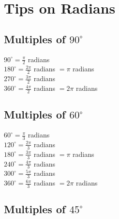 \documentclass[12pt]{article}
\begin{document}
\section*{Tips on Radians}

\subsection*{Multiples of $90^\circ$}


\begin{multicols}{2}

$90^\circ=\frac{\pi}{2}$ radians \\

$180^\circ=\frac{2\pi}{2}$ radians $=\pi$ radians \\
 
$270^\circ=\frac{3\pi}{2}$ radians \\
 
 $360^\circ=\frac{4\pi}{2}$ radians $=2\pi$ radians\\

\end{multicols}

\subsection*{Multiples of $60^\circ$}


\begin{multicols}{2}

$60^\circ=\frac{\pi}{3}$ radians \\
 
$120^\circ=\frac{2\pi}{3}$ radians \\
  
$180^\circ=\frac{3\pi}{3}$ radians $=\pi$ radians \\
   
$240^\circ=\frac{4\pi}{3}$ radians \\
    
$300^\circ=\frac{5\pi}{3}$ radians \\
     
$360^\circ=\frac{6\pi}{3}$ radians $=2\pi$ radians \\

\end{multicols}

\subsection*{Multiples of $45^\circ$}
\end{document}
